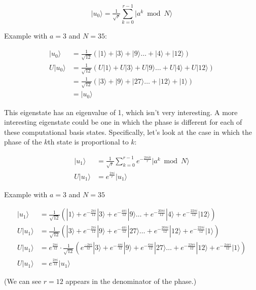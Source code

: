 \documentclass{article}
\begin{document}
\[|u_0\rangle = \tfrac{1}{\sqrt{r}}\sum_{k=0}^{r-1}{|a^k \bmod N\rangle} \]

Example with \(a = 3\) and \(N=35\):

\[\begin{aligned}
|u_0\rangle &= \tfrac{1}{\sqrt{12}}(|1\rangle + |3\rangle + |9\rangle \dots + |4\rangle + |12\rangle) \\[10pt]
U|u_0\rangle &= \tfrac{1}{\sqrt{12}}(U|1\rangle + U|3\rangle + U|9\rangle \dots + U|4\rangle + U|12\rangle) \\[10pt]
 &= \tfrac{1}{\sqrt{12}}(|3\rangle + |9\rangle + |27\rangle \dots + |12\rangle + |1\rangle) \\[10pt]
 &= |u_0\rangle
\end{aligned}\]

This eigenstate has an eigenvalue of 1, which isn't very interesting. A
more interesting eigenstate could be one in which the phase is different
for each of these computational basis states. Specifically, let's look
at the case in which the phase of the \(k\)th state is proportional to
\(k\):

\[\begin{aligned}
|u_1\rangle &= \tfrac{1}{\sqrt{r}}\sum_{k=0}^{r-1}{e^{-\tfrac{2\pi i k}{r}}|a^k \bmod N\rangle}\\[10pt]
U|u_1\rangle &= e^{\tfrac{2\pi i}{r}}|u_1\rangle 
\end{aligned}
\]

Example with \(a = 3\) and \(N=35\)

\[\begin{aligned}
|u_1\rangle &= \tfrac{1}{\sqrt{12}}(|1\rangle + e^{-\tfrac{2\pi i}{12}}|3\rangle + e^{-\tfrac{4\pi i}{12}}|9\rangle \dots + e^{-\tfrac{20\pi i}{12}}|4\rangle + e^{-\tfrac{22\pi i}{12}}|12\rangle) \\[10pt]
U|u_1\rangle &= \tfrac{1}{\sqrt{12}}(|3\rangle + e^{-\tfrac{2\pi i}{12}}|9\rangle + e^{-\tfrac{4\pi i}{12}}|27\rangle \dots + e^{-\tfrac{20\pi i}{12}}|12\rangle + e^{-\tfrac{22\pi i}{12}}|1\rangle) \\[10pt]
U|u_1\rangle &= e^{\tfrac{2\pi i}{12}}\cdot\tfrac{1}{\sqrt{12}}(e^{\tfrac{-2\pi i}{12}}|3\rangle + e^{-\tfrac{4\pi i}{12}}|9\rangle + e^{-\tfrac{6\pi i}{12}}|27\rangle \dots + e^{-\tfrac{22\pi i}{12}}|12\rangle + e^{-\tfrac{24\pi i}{12}}|1\rangle) \\[10pt]
U|u_1\rangle &= e^{\tfrac{2\pi i}{12}}|u_1\rangle
\end{aligned}\]

(We can see \(r = 12\) appears in the denominator of the phase.)
\end{document}
